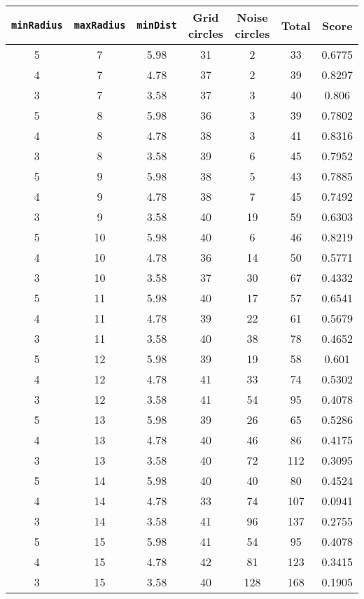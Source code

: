 \documentclass[letterpaper, 12pt]{article}
\begin{document}
\begin{longtable}{|c|c|c|c|c|c|c|}
\hline
\textbf{\texttt{minRadius}} & \textbf{\texttt{maxRadius}} & \textbf{\texttt{minDist}} & \textbf{Grid circles} & \textbf{Noise circles} & \textbf{Total} & \textbf{Score} \\
\hline
5 & 7 & 5.98 & 31 & 2 & 33 & 0.6775 \\
\hline
4 & 7 & 4.78 & 37 & 2 & 39 & 0.8297 \\
\hline
3 & 7 & 3.58 & 37 & 3 & 40 & 0.806 \\
\hline
5 & 8 & 5.98 & 36 & 3 & 39 & 0.7802 \\
\hline
4 & 8 & 4.78 & 38 & 3 & 41 & 0.8316 \\
\hline
3 & 8 & 3.58 & 39 & 6 & 45 & 0.7952 \\
\hline
5 & 9 & 5.98 & 38 & 5 & 43 & 0.7885 \\
\hline
4 & 9 & 4.78 & 38 & 7 & 45 & 0.7492 \\
\hline
3 & 9 & 3.58 & 40 & 19 & 59 & 0.6303 \\
\hline
5 & 10 & 5.98 & 40 & 6 & 46 & 0.8219 \\
\hline
4 & 10 & 4.78 & 36 & 14 & 50 & 0.5771 \\
\hline
3 & 10 & 3.58 & 37 & 30 & 67 & 0.4332 \\
\hline
5 & 11 & 5.98 & 40 & 17 & 57 & 0.6541 \\
\hline
4 & 11 & 4.78 & 39 & 22 & 61 & 0.5679 \\
\hline
3 & 11 & 3.58 & 40 & 38 & 78 & 0.4652 \\
\hline
5 & 12 & 5.98 & 39 & 19 & 58 & 0.601 \\
\hline
4 & 12 & 4.78 & 41 & 33 & 74 & 0.5302 \\
\hline
3 & 12 & 3.58 & 41 & 54 & 95 & 0.4078 \\
\hline
5 & 13 & 5.98 & 39 & 26 & 65 & 0.5286 \\
\hline
4 & 13 & 4.78 & 40 & 46 & 86 & 0.4175 \\
\hline
3 & 13 & 3.58 & 40 & 72 & 112 & 0.3095 \\
\hline
5 & 14 & 5.98 & 40 & 40 & 80 & 0.4524 \\
\hline
4 & 14 & 4.78 & 33 & 74 & 107 & 0.0941 \\
\hline
3 & 14 & 3.58 & 41 & 96 & 137 & 0.2755 \\
\hline
5 & 15 & 5.98 & 41 & 54 & 95 & 0.4078 \\
\hline
4 & 15 & 4.78 & 42 & 81 & 123 & 0.3415 \\
\hline
3 & 15 & 3.58 & 40 & 128 & 168 & 0.1905 \\

\end{longtable}
\end{document}
